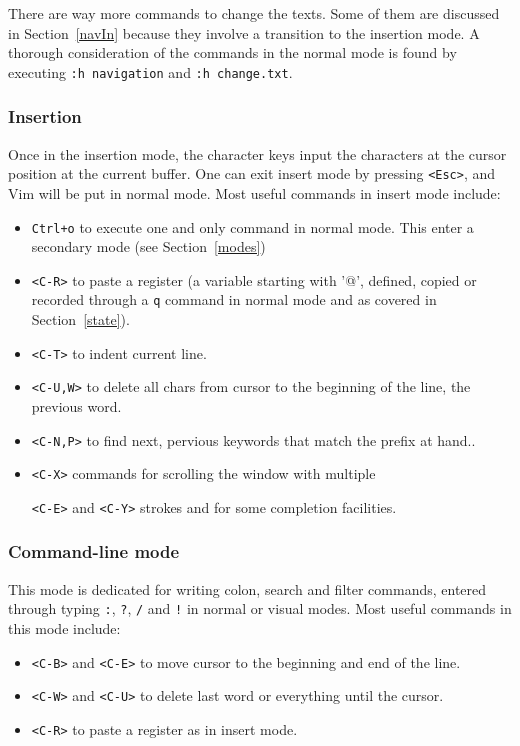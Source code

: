 \documentclass{article}
\newcommand{\ttt}[1] {
	\texttt{<#1>}}
\newcommand{\tttt}[1] {
	\texttt{#1}}
\begin{document}
There are way more commands to change the texts.
Some of them are discussed in Section~\ref{navIn}
because they involve a transition to the insertion mode.
A thorough consideration of the commands in the normal mode
is found by executing \texttt{:h navigation} and 
\texttt{:h change.txt}.

\subsubsection{Insertion}
Once in the insertion mode, the character keys
input the characters at the cursor position at the current buffer.
One can exit insert mode by pressing \texttt{<Esc>},
and Vim will be put in normal mode.
Most useful commands in insert mode include:
\begin{itemize}
  \item \texttt{Ctrl+o} to execute one and only command in normal mode.
	  This enter a secondary mode (see Section~\ref{modes})
  \item \ttt{C-R} to paste a register (a variable starting with
    '@', defined, copied or recorded through a \tttt{q} command in
    normal mode and as covered in Section~\ref{state}).
  \item \ttt{C-T} to indent current line.
  \item \ttt{C-U,W} to delete all chars from cursor to the beginning of
    the line, the previous word.
  \item \ttt{C-N,P} to find next, pervious keywords that match the prefix at hand..
  \item \ttt{C-X} commands for scrolling the window with multiple
    \ttt{C-E} and \ttt{C-Y} strokes and for some completion facilities.
\end{itemize}

\subsubsection{Command-line mode}
This mode is dedicated for writing colon, search and filter commands,
entered through typing \tttt{:}, \tttt{?}, \tttt{/} and \tttt{!} in normal or visual modes.
Most useful commands in this mode include:
\begin{itemize}
  \item \ttt{C-B} and \ttt{C-E} to move cursor to the beginning and
    end of the line.
  \item \ttt{C-W} and \ttt{C-U} to delete last word or everything
    until the cursor.
  \item \ttt{C-R} to paste a register as in insert mode.
\end{itemize}
\end{document}
